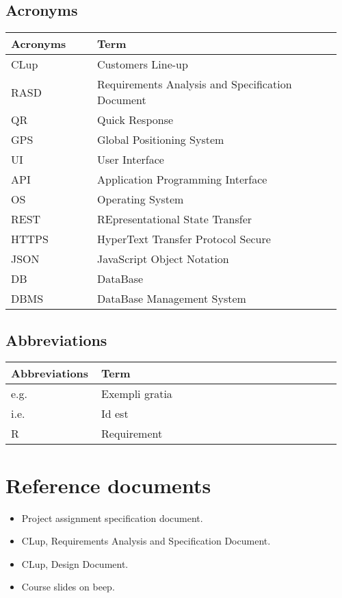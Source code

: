 \subsection{Acronyms}
\begin{center}
	\begin{tabular}{@{}p{0.25\linewidth} p{0.71\linewidth}@{}}
		\toprule
		\textbf{Acronyms} & \textbf{Term}\\
		\midrule
		CLup & Customers Line-up\\
		RASD & Requirements Analysis and Specification Document\\
		QR & Quick Response\\
		GPS & Global Positioning System\\
		UI & User Interface\\
		API & Application Programming Interface\\
		OS & Operating System\\
		REST & REpresentational State Transfer\\
		HTTPS & HyperText Transfer Protocol Secure\\
		JSON & JavaScript Object Notation\\	
		DB & DataBase\\
		DBMS & DataBase Management System\\
		\bottomrule
	\end{tabular}
\end{center}

\subsection{Abbreviations}
\begin{center}
	\begin{tabular}{@{}p{0.25\linewidth} p{0.71\linewidth}@{}}
		\toprule
		\textbf{Abbreviations} & \textbf{Term}\\
		\midrule
		e.g. & Exempli gratia\\
		i.e. & Id est\\
		R & Requirement\\		
		\bottomrule
	\end{tabular}
\end{center}

\section{Reference documents}
\begin{itemize}
	\item Project assignment specification document.
    \item CLup, Requirements Analysis and Specification Document.
    \item CLup, Design Document.
	\item Course slides on beep.
\end{itemize}

